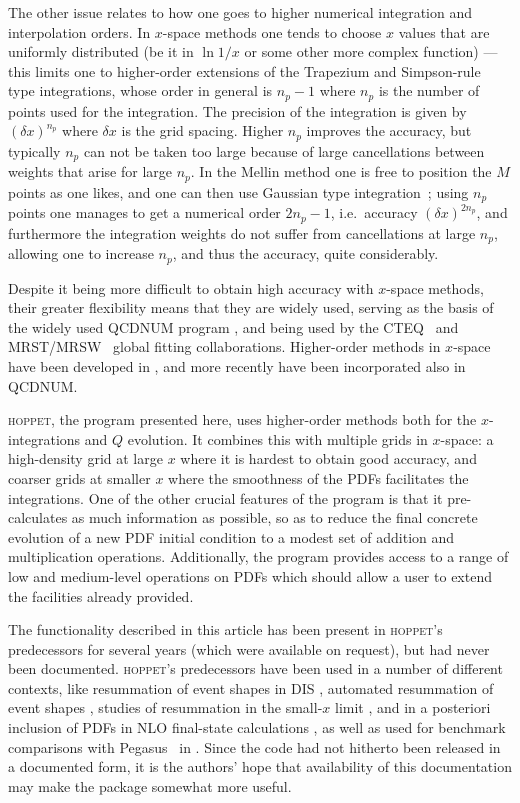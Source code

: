 \documentclass[12pt]{article}
\newcommand{\lp}{\left(}
\newcommand{\rp}{\right)}
\newcommand{\ie}{i.e.\ }
\newcommand{\hoppet}{\textsc{hoppet}\xspace}
\begin{document}
The other issue relates to how one goes to higher numerical
integration and interpolation orders.
In $x$-space methods one tends to choose $x$ values that are uniformly
distributed (be it in $\ln 1/x$ or some other more complex function)
--- this limits one to higher-order extensions of the Trapezium and
Simpson-rule type integrations, whose order in general is $n_p-1$
where $n_p$ is the number of points used for the integration. The
precision of the integration is given by $\lp\delta x\rp^{n_p}$ where
$\delta x$ is the grid spacing. Higher $n_p$ improves the accuracy,
but typically $n_p$ can not be taken too large because of large
cancellations between weights that arise for large $n_p$.
%
%
In the Mellin method one is free to position the $M$ points as one
likes, and one can then use Gaussian type
integration~\cite{Weinzierl:2002mv,Pegasus,Kosower:1997hg}; using $n_p$
points one manages to get a numerical order $2n_p-1$, \ie accuracy
$\lp \delta x\rp^{2n_p}$, and furthermore the integration weights do not suffer
from cancellations at large $n_p$, allowing one to increase
$n_p$, and thus the accuracy, quite considerably.

Despite it being more difficult to obtain high accuracy with $x$-space
methods, their greater flexibility means that they are widely used,
serving as the basis of the widely used QCDNUM program \cite{Botje},
and being used by the CTEQ~\cite{CTEQ} and MRST/MRSW~\cite{MRST}
global fitting
collaborations. Higher-order methods in $x$-space have been developed
in \cite{Schoeffel:1998tz,Pascaud:2001bi,coriano,GuzziThesis}, and
more recently have been incorporated also in QCDNUM.

\hoppet, the program presented here, uses higher-order methods both for
the $x$-integrations and $Q$ evolution. It combines this with multiple
grids in $x$-space: a high-density grid at large $x$ where it is
hardest to obtain good accuracy, and coarser grids at smaller $x$
where the smoothness of the PDFs facilitates the integrations. One of
the other crucial features of the program is that it pre-calculates as
much information as possible, so as to reduce the final concrete
evolution of a new PDF initial condition to a modest set of addition
and multiplication operations. Additionally, the program provides
access to a range of low and medium-level operations on PDFs which
should allow a user to extend the facilities already provided.


The functionality described in this article has been present in
\hoppet's predecessors for several years (which were available on
request), but had
never been documented. 
\hoppet's predecessors have  been used in a number of different
contexts, like resummation of event shapes
in DIS \cite{DisResum}, automated resummation
of event shapes \cite{caesar}, studies of
resummation in the small-$x$ limit \cite{Ciafaloni:2003rd}, 
and in a posteriori inclusion
of PDFs in NLO final-state calculations \cite{APPL,Banfi:2007gu}, as well
as  used for benchmark
comparisons with Pegasus~\cite{Pegasus} in \cite{Benchmarks}.
Since the code had
not hitherto been released in a documented form, 
it is the authors' hope that availability of
this documentation may make the package somewhat more useful.
\end{document}
